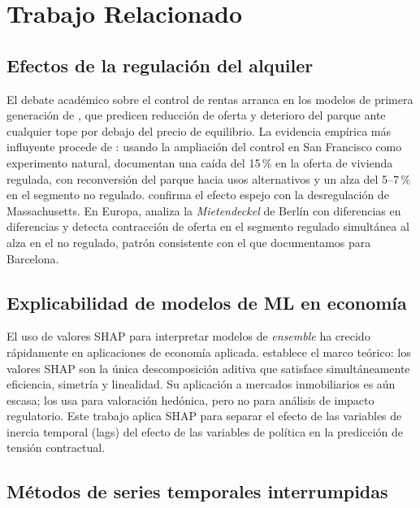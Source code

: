 \documentclass[10pt,a4paper,twocolumn]{article}
\begin{document}
\section{Trabajo Relacionado}
\label{sec:relacionados}

\subsection{Efectos de la regulación del alquiler}

El debate académico sobre el control de rentas arranca en los modelos de primera
generación de \citet{arnott1995rent}, que predicen reducción de oferta y deterioro
del parque ante cualquier tope por debajo del precio de equilibrio. La evidencia
empírica más influyente procede de \citet{diamond2019rent}: usando la ampliación
del control en San Francisco como experimento natural, documentan una caída del 15\,\%
en la oferta de vivienda regulada, con reconversión del parque hacia usos alternativos
y un alza del 5--7\,\% en el segmento no regulado. \citet{sims2007rent} confirma
el efecto espejo con la desregulación de Massachusetts. En Europa, \citet{kholodilin2021rent}
analiza la \textit{Mietendeckel} de Berlín con diferencias en diferencias y detecta
contracción de oferta en el segmento regulado simultánea al alza en el no regulado,
patrón consistente con el que documentamos para Barcelona.

\subsection{Explicabilidad de modelos de ML en economía}

El uso de valores SHAP \citep{lundberg2017shap} para interpretar modelos de
\textit{ensemble} ha crecido rápidamente en aplicaciones de economía aplicada.
\citet{molnar2020interpretable} establece el marco teórico: los valores SHAP son
la única descomposición aditiva que satisface simultáneamente eficiencia, simetría
y linealidad. Su aplicación a mercados inmobiliarios es aún escasa;
\citet{antipov2020shap} los usa para valoración hedónica, pero no para análisis
de impacto regulatorio. Este trabajo aplica SHAP para separar el efecto de las
variables de inercia temporal (lags) del efecto de las variables de política
en la predicción de tensión contractual.

\subsection{Métodos de series temporales interrumpidas}
\end{document}
